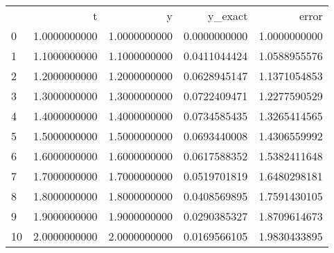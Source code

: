 \begin{tabular}{lrrrr}
 & t & y & y_exact & error \\
0 & 1.0000000000 & 1.0000000000 & 0.0000000000 & 1.0000000000 \\
1 & 1.1000000000 & 1.1000000000 & 0.0411044424 & 1.0588955576 \\
2 & 1.2000000000 & 1.2000000000 & 0.0628945147 & 1.1371054853 \\
3 & 1.3000000000 & 1.3000000000 & 0.0722409471 & 1.2277590529 \\
4 & 1.4000000000 & 1.4000000000 & 0.0734585435 & 1.3265414565 \\
5 & 1.5000000000 & 1.5000000000 & 0.0693440008 & 1.4306559992 \\
6 & 1.6000000000 & 1.6000000000 & 0.0617588352 & 1.5382411648 \\
7 & 1.7000000000 & 1.7000000000 & 0.0519701819 & 1.6480298181 \\
8 & 1.8000000000 & 1.8000000000 & 0.0408569895 & 1.7591430105 \\
9 & 1.9000000000 & 1.9000000000 & 0.0290385327 & 1.8709614673 \\
10 & 2.0000000000 & 2.0000000000 & 0.0169566105 & 1.9830433895 \\
\end{tabular}
